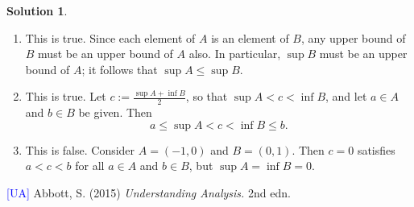 \documentclass[12pt]{article}
\theoremstyle{definition}
\theoremstyle{exercise}
\theoremstyle{solution}
\newtheorem*{solution}{Solution}
\begin{document}
\begin{solution}
    \begin{enumerate}
        \item This is true. Since each element of \( A \) is an element of \( B \), any upper bound of \( B \) must be an upper bound of \( A \) also. In particular, \( \sup B \) must be an upper bound of \( A \); it follows that \( \sup A \leq \sup B \).

        \item This is true. Let \( c := \tfrac{\sup A + \inf B}{2} \), so that \( \sup A < c < \inf B\), and let \( a \in A \) and \( b \in B \) be given. Then
        \[
            a \leq \sup A < c < \inf B \leq b.
        \]

        \item This is false. Consider \( A = (-1, 0) \) and \( B = (0, 1) \). Then \( c = 0 \) satisfies \( a < c < b \) for all \( a \in A \) and \( b \in B \), but \( \sup A = \inf B = 0 \).
    \end{enumerate}
\end{solution}

\noindent \hrulefill

\noindent \hypertarget{ua}{\textcolor{blue}{[UA]} Abbott, S. (2015) \textit{Understanding Analysis.} 2nd edn.}
\end{document}
